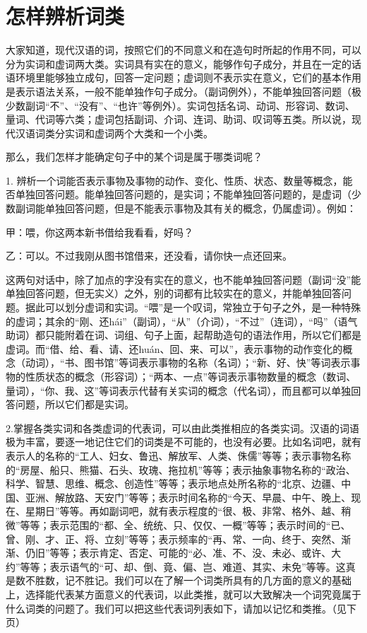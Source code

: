 \section{怎样辨析词类}

大家知道，现代汉语的词，按照它们的不同意义和在造句时所起的作用不同，可以分为实词和虚词两大类。实词具有实在的意义，能够作句子成分，并且在一定的话语环境里能够独立成句，回答一定问题；虚词则不表示实在意义，它们的基本作用是表示语法关系，一般不能单独作句子成分。（副词例外），不能单独回答问题（极少数副词“不”、“没有”、“也许”等例外）。实词包括名词、动词、形容词、数词、量词、代词等六类；虚词包括副词、介词、连词、助词、叹词等五类。所以说，现代汉语词类分实词和虚词两个大类和一个小类。

那么，我们怎样才能确定句子中的某个词是属于哪类词呢？

1. 辨析一个词能否表示事物及事物的动作、变化、性质、状态、数量等概念，能否单独回答问题。能单独回答问题的，是实词；不能单独回答问题的，是虚词（少数副词能单独回答问题，但是不能表示事物及其有关的概念，仍属虚词）。例如：

甲：喂，你这两本新书借给我看看，好吗？

乙：可以。不过我刚从图书馆借来，还没看，请你快一点还回来。

这两句对话中，除了加点的字没有实在的意义，也不能单独回答问题（副词“没”能单独回答问题，但无实义）之外，别的词都有比较实在的意义，并能单独回答问题。据此可以划分虚词和实词。“喂”是一个叹词，常独立于句子之外，是一种特殊的虚词；其余的“刚、还hái”（副词），“从”（介词），“不过”（连词），“吗”（语气助词）都只能附着在词、词组、句子上面，起帮助造句的语法作用，所以它们都是虚词。而“借、给、看、请、还huán、回、来、可以”，表示事物的动作变化的概念（动词），“书、图书馆”等词表示事物的名称（名词）；“新、好、快”等词表示事物的性质状态的概念（形容词）；“两本、一点”等词表示事物数量的概念（数词、量词），“你、我、这”等词表示代替有关实词的概念（代名词），而且都可以单独回答问题，所以它们都是实词。

2.掌握各类实词和各类虚词的代表词，可以由此类推相应的各类实词。汉语的词语极为丰富，要逐一地记住它们的词类是不可能的，也没有必要。比如名词吧，就有表示人的名称的“工人、妇女、鲁迅、解放军、人类、侏儒”等等；表示事物名称的“房屋、船只、熊猫、石头、玫瑰、拖拉机”等等；表示抽象事物名称的“政治、科学、智慧、思维、概念、创造性”等等；表示地点处所名称的“北京、边疆、中国、亚洲、解放路、天安门”等等；表示时间名称的“今天、早晨、中午、晚上、现在、星期日”等等。再如副词吧，就有表示程度的“很、极、非常、格外、越、稍微”等等；表示范围的“都、全、统统、只、仅仅、一概”等等；表示时间的“已、曾、刚、才、正、将、立刻”等等；表示频率的“再、常、一向、终于、突然、渐渐、仍旧”等等；表示肯定、否定、可能的“必、准、不、没、未必、或许、大约”等等；表示语气的“可、却、倒、竟、偏、岂、难道、其实、未免”等等。这真是数不胜数，记不胜记。我们可以在了解一个词类所具有的几方面的意义的基础上，选择能代表某方面意义的代表词，以此类推，就可以大致解决一个词究竟属于什么词类的问题了。我们可以把这些代表词列表如下，请加以记忆和类推。（见下页）

